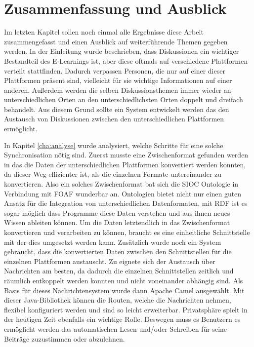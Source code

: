 
\chapter{Zusammenfassung und Ausblick} %
\label{cha:zusammenfassung_und_ausblick}

Im letzten Kapitel sollen noch einmal alle Ergebnisse diese Arbeit zusammengefasst und einen Ausblick auf weiterführende Themen gegeben werden. In der Einleitung wurde beschrieben, dass Diskussionen ein wichtiger Bestandteil des E-Learnings ist, aber diese oftmals auf verschiedene Plattformen verteilt stattfinden. Dadurch verpassen Personen, die nur auf einer dieser Plattformen präsent sind, vielleicht für sie wichtige Informationen auf einer anderen. Außerdem werden die selben Diskussionsthemen immer wieder an unterschiedlichen Orten an den unterschiedlichsten Orten doppelt und dreifach behandelt. Aus diesem Grund sollte ein System entwickelt werden das den Austausch von Diskussionen zwischen den unterschiedlichen Plattformen ermöglicht. 

In Kapitel \ref{cha:analyse} wurde analysiert, welche Schritte für eine solche Synchronisation nötig sind. Zuerst musste eine Zwischenformat gefunden werden in das die Daten der unterschiedlichen Plattformen konvertiert werden konnten, da dieser Weg effizienter ist, als die einzelnen Formate untereinander zu konvertieren. Also ein solches Zwischenformat bat sich die SIOC Ontologie in Verbindung mit FOAF wunderbar an. Ontologien bietet nicht nur einen guten Ansatz für die Integration von unterschiedlichen Datenformaten, mit RDF ist es sogar möglich dass Programme diese Daten verstehen und aus ihnen neues Wissen ableiten können. Um die Daten letztendlich in das Zwischenformat konvertieren und verarbeiten zu können, braucht es eine einheitliche Schnittstelle mit der dies umgesetzt werden kann. Zusätzlich wurde noch ein System gebraucht, dass die konvertierten Daten zwischen den Schnittstellen für die einzelnen Plattformen austauscht. Zu eignete sich der Austausch über Nachrichten am besten, da dadurch die einzelnen Schnittstellen zeitlich und räumlich entkoppelt werden konnten und nicht voneinander abhängig sind. Als Basis für dieses Nachrichtensystem wurde dann Apache Camel ausgewählt. Mit dieser Java-Bibliothek können die Routen, welche die Nachrichten nehmen, flexibel konfiguriert werden und sind so leicht erweiterbar. Privatsphäre spielt in der heutigen Zeit ebenfalls ein wichtige Rolle. Deswegen muss es Benutzern es ermöglicht werden das automatischen Lesen und/oder Schreiben für seine Beiträge zuzustimmen oder abzulehnen.

